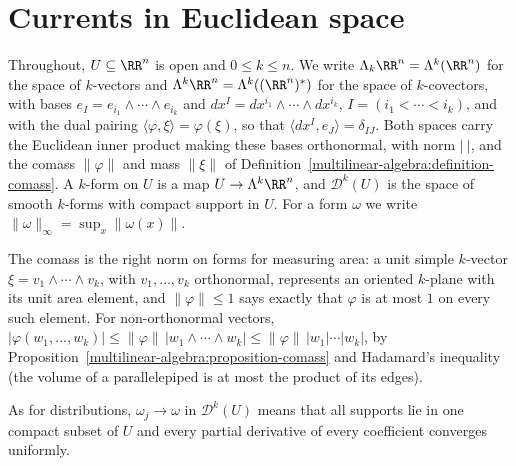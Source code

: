 \section{Currents in Euclidean space}\label{currents:section-currents}

\begin{notation}\label{currents:notation-multivectors}
Throughout, $U \subseteq \RR^n$ is open and $0 \leq k \leq n$. We write $\Lambda_k\RR^n = \Lambda^k(\RR^n)$ for the space of $k$-vectors and $\Lambda^k\RR^n = \Lambda^k((\RR^n)^*)$ for the space of $k$-covectors,
with bases $e_I = e_{i_1} \wedge \cdots \wedge e_{i_k}$ and $dx^I = dx^{i_1} \wedge \cdots \wedge dx^{i_k}$, $I = (i_1 < \cdots < i_k)$, and with the dual pairing $\langle\varphi, \xi\rangle = \varphi(\xi)$, so that
$\langle dx^I, e_J\rangle = \delta_{IJ}$. Both spaces carry the Euclidean inner product making these bases orthonormal, with norm $|\ |$, and the comass $\|\varphi\|$ and mass $\|\xi\|$ of
Definition~\ref{multilinear-algebra:definition-comass}. A $k$-form on $U$ is a map $U \to \Lambda^k\RR^n$, and $\mathcal{D}^k(U)$ is the space of smooth $k$-forms with compact support in $U$. For a form
$\omega$ we write $\|\omega\|_\infty = \sup_x\|\omega(x)\|$.
\end{notation}

The comass is the right norm on forms for measuring area: a unit simple $k$-vector $\xi = v_1 \wedge \cdots \wedge v_k$, with $v_1, \ldots, v_k$ orthonormal, represents an oriented $k$-plane with its unit area
element, and $\|\varphi\| \leq 1$ says exactly that $\varphi$ is at most $1$ on every such element. For non-orthonormal vectors, $|\varphi(w_1, \ldots, w_k)| \leq \|\varphi\|\,|w_1 \wedge \cdots \wedge w_k| \leq \|\varphi\|\,|w_1|\cdots|w_k|$,
by Proposition~\ref{multilinear-algebra:proposition-comass} and Hadamard's inequality (the volume of a parallelepiped is at most the product of its edges).

As for distributions, $\omega_j \to \omega$ in $\mathcal{D}^k(U)$ means that all supports lie in one compact subset of $U$ and every partial derivative of every coefficient converges uniformly.

